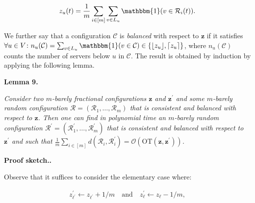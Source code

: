 \documentclass[10pt,a4paper]{article}
\begin{document}
\[\begin{gathered}
z_{u}(t)=\frac{1}{m}\sum_{i\in[m]}\sum_{v\in L_{u}}\mathbbm{1}(v\in\mathcal{R}_{i}(t)).
\end{gathered}\]


We further say that a configuration $\mathcal{C}$ is \emph{balanced} with respect to ${\mathbf{z}}$ if it satisfies
$\forall u\in V\colon n_{u}(\mathcal{C})=\sum_{v\in L_{u}}\mathbbm{1}(v\in\mathcal{C})\in\{{\lfloor z_{u}\rfloor},{\lceil z_{u}\rceil}\}$,
where $n_{u}(\mathcal{C})$ counts the number of servers below $u$ in $\mathcal{C}$.
The result is obtained by induction by applying the following lemma.\par





\par\medskip\noindent\textbf{
\textbf{Lemma 9}\textbf{.}
}\par



\emph{Consider two $m$-barely fractional configurations ${\mathbf{z}}$ and ${\mathbf{z}}^{\prime}$ and some $m$-barely random configuration $\mathcal{R}=(\mathcal{R}_{1},\dots,\mathcal{R}_{m})$ that is consistent and balanced with respect to ${\mathbf{z}}$. Then one can find in polynomial time an $m$-barely random configuration $\mathcal{R}^{\prime}=(\mathcal{R}_{1}^{\prime},\dots,\mathcal{R}_{m}^{\prime})$ that is consistent and balanced with respect to ${\mathbf{z}}^{\prime}$ and such that $\frac{1}{m}\sum_{i\in[m]}d(\mathcal{R}_{i},\mathcal{R}_{i}^{\prime})=\mathcal{O}({\text{OT}}({\mathbf{z}},{\mathbf{z}}^{\prime}))$.}\par







\par\medskip\noindent\textbf{Proof sketch..}\par




Observe that it suffices to consider the elementary case where:\par


\[\begin{gathered}
z_{\ell^{\prime}}^{\prime}\leftarrow z_{\ell^{\prime}}+1/m\quad\text{and}\quad
z_{\ell}^{\prime}\leftarrow z_{\ell}-1/m,
\end{gathered}\]
\end{document}
